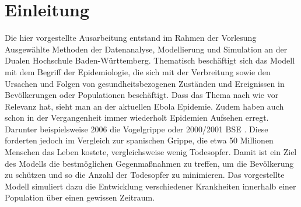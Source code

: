 \section*{Einleitung}

Die hier vorgestellte Ausarbeitung entstand im Rahmen der Vorlesung \glqq Ausgewählte Methoden der Datenanalyse, Modellierung und Simulation\grqq\; an der Dualen Hochschule Baden-Württemberg. Thematisch beschäftigt sich das Modell mit dem Begriff der Epidemiologie, die sich mit der Verbreitung sowie den Ursachen und Folgen von gesundheitsbezogenen Zuständen und Ereignissen in Bevölkerungen oder Populationen beschäftigt. %
Dass das Thema nach wie vor Relevanz hat, sieht man an der aktuellen Ebola Epidemie. Zudem haben auch schon in der Vergangenheit immer wiederholt Epidemien Aufsehen erregt. Darunter beispielsweise 2006 die Vogelgrippe \cite{gehlhoff2007chronik}
oder 2000/2001 BSE \cite{Spon:2014}. Diese forderten jedoch im Vergleich zur spanischen Grippe, die etwa 50 Millionen Menschen das Leben kostete, vergleichsweise wenig Todesopfer.
Damit ist ein Ziel des Modells die bestmöglichen Gegenmaßnahmen zu treffen, um die Bevölkerung zu schützen und so die Anzahl der Todesopfer zu minimieren.
Das vorgestellte Modell simuliert dazu die Entwicklung verschiedener Krankheiten innerhalb einer Population über einen gewissen Zeitraum. 



%
%
